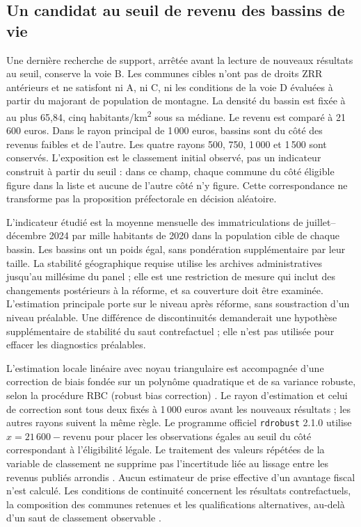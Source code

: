 \subsection{Un candidat au seuil de revenu des bassins de vie}
Une dernière recherche de support, arrêtée avant la lecture de nouveaux résultats au seuil, conserve la voie B. Les communes cibles n’ont pas de droits ZRR antérieurs et ne satisfont ni A, ni C, ni les conditions de la voie D évaluées à partir du majorant de population de montagne. La densité du bassin est fixée à au plus 65,84, cinq habitants/km\textsuperscript{2} sous sa médiane. Le revenu est comparé à 21\,600 euros. Dans le rayon principal de 1\,000 euros, \BVRDEligibleN{} bassins sont du côté des revenus faibles et \BVRDControlN{} de l’autre. Les quatre rayons 500, 750, 1\,000 et 1\,500 sont conservés. L’exposition est le classement initial observé, pas un indicateur construit à partir du seuil : dans ce champ, chaque commune du côté éligible figure dans la liste et aucune de l’autre côté n’y figure. Cette correspondance ne transforme pas la proposition préfectorale en décision aléatoire.

L’indicateur étudié est la moyenne mensuelle des immatriculations de juillet–décembre 2024 par mille habitants de 2020 dans la population cible de chaque bassin. Les bassins ont un poids égal, sans pondération supplémentaire par leur taille. La stabilité géographique requise utilise les archives administratives jusqu’au millésime du panel ; elle est une restriction de mesure qui inclut des changements postérieurs à la réforme, et sa couverture doit être examinée. L’estimation principale porte sur le niveau après réforme, sans soustraction d’un niveau préalable. Une différence de discontinuités demanderait une hypothèse supplémentaire de stabilité du saut contrefactuel ; elle n’est pas utilisée pour effacer les diagnostics préalables.

L’estimation locale linéaire avec noyau triangulaire est accompagnée d’une correction de biais fondée sur un polynôme quadratique et de sa variance robuste, selon la procédure RBC (robust bias correction) \citep{ref11}. Le rayon d’estimation et celui de correction sont tous deux fixés à 1\,000 euros avant les nouveaux résultats ; les autres rayons suivent la même règle. Le programme officiel \texttt{rdrobust} 2.1.0 utilise $x=21\,600-\text{revenu}$ pour placer les observations égales au seuil du côté correspondant à l’éligibilité légale. Le traitement des valeurs répétées de la variable de classement ne supprime pas l’incertitude liée au lissage entre les revenus publiés arrondis \citep{ref12}. Aucun estimateur de prise effective d’un avantage fiscal n’est calculé. Les conditions de continuité concernent les résultats contrefactuels, la composition des communes retenues et les qualifications alternatives, au-delà d’un saut de classement observable \citep{ref13}.

